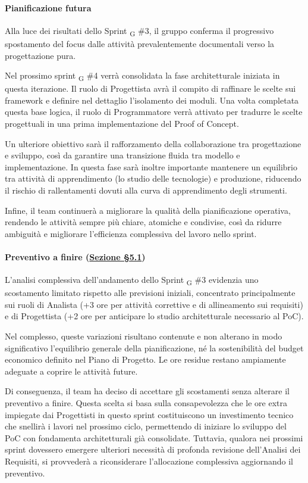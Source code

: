 \documentclass[a4paper, 10pt, colorlinks=true, linkcolor=black, urlcolor=blue, citecolor=blue, hidelinks]{article}
\begin{document}
\paragraph{Pianificazione futura}
Alla luce dei risultati dello Sprint \textsubscript{G} \#3, il gruppo conferma il progressivo spostamento del focus dalle attività prevalentemente documentali verso la progettazione pura.

Nel prossimo sprint \textsubscript{G} \#4 verrà consolidata la fase architetturale iniziata in questa iterazione. Il ruolo di Progettista avrà il compito di raffinare le scelte sui framework e definire nel dettaglio l'isolamento dei moduli. Una volta completata questa base logica, il ruolo di Programmatore verrà attivato per tradurre le scelte progettuali in una prima implementazione del Proof of Concept.

Un ulteriore obiettivo sarà il rafforzamento della collaborazione tra progettazione e sviluppo, così da garantire una transizione fluida tra modello e implementazione. In questa fase sarà inoltre importante mantenere un equilibrio tra attività di apprendimento (lo studio delle tecnologie) e produzione, riducendo il rischio di rallentamenti dovuti alla curva di apprendimento degli strumenti.

Infine, il team continuerà a migliorare la qualità della pianificazione operativa, rendendo le attività sempre più chiare, atomiche e condivise, così da ridurre ambiguità e migliorare l’efficienza complessiva del lavoro nello sprint.

\paragraph{Preventivo a finire (\hyperref[tab:preventivo-finire]{Sezione \S5.1})}
L’analisi complessiva dell’andamento dello Sprint \textsubscript{G} \#3 evidenzia uno scostamento limitato rispetto alle previsioni iniziali, concentrato principalmente sui ruoli di Analista (+3 ore per attività correttive e di allineamento sui requisiti) e di Progettista (+2 ore per anticipare lo studio architetturale necessario al PoC).

Nel complesso, queste variazioni risultano contenute e non alterano in modo significativo l’equilibrio generale della pianificazione, né la sostenibilità del budget economico definito nel Piano di Progetto. Le ore residue restano ampiamente adeguate a coprire le attività future.

Di conseguenza, il team ha deciso di accettare gli scostamenti senza alterare il preventivo a finire. Questa scelta si basa sulla consapevolezza che le ore extra impiegate dai Progettisti in questo sprint costituiscono un investimento tecnico che snellirà i lavori nel prossimo ciclo, permettendo di iniziare lo sviluppo del PoC con fondamenta architetturali già consolidate. Tuttavia, qualora nei prossimi sprint dovessero emergere ulteriori necessità di profonda revisione dell'Analisi dei Requisiti, si provvederà a riconsiderare l’allocazione complessiva aggiornando il preventivo.
\end{document}
